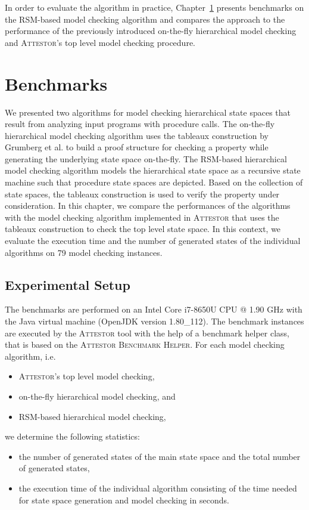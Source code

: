 \documentclass[a4paper, 12pt, twoside]{report}
\begin{document}
	In order to evaluate the algorithm in practice, Chapter~\ref{chp:benchmarks} presents benchmarks on the RSM-based model checking algorithm and compares the approach to the performance of the previously introduced on-the-fly hierarchical model checking and \textsc{Attestor}'s top level model checking procedure.
	
	\chapter{Benchmarks}\label{chp:benchmarks}	
	
	We presented two algorithms for model checking hierarchical state spaces that result from analyzing input programs with procedure calls. The on-the-fly hierarchical model checking algorithm uses the tableaux construction by Grumberg et al. \cite{bhat1995efficient} to build a proof structure for checking a property while generating the underlying state space on-the-fly. The RSM-based hierarchical model checking algorithm models the hierarchical state space as a recursive state machine such that procedure state spaces are depicted. Based on the collection of state spaces, the tableaux construction is used to verify the property under consideration. In this chapter, we compare the performances of the algorithms with the model checking algorithm implemented in \textsc{Attestor} that uses the tableaux construction to check the top level state space. In this context, we evaluate the execution time and the number of generated states of the individual algorithms on 79 model checking instances. 
	
	\section{Experimental Setup}
	
	The benchmarks are performed on an Intel Core i7-8650U CPU @ 1.90 GHz with the Java virtual machine (OpenJDK version 1.80\_112). The benchmark instances are executed by the \textsc{Attestor} tool with the help of a benchmark helper class, that is based on the \textsc{Attestor Benchmark Helper}. For each model checking algorithm, i.e.
	\begin{itemize}
		\item \textsc{Attestor}'s top level model checking,
		\item on-the-fly hierarchical model checking, and
		\item RSM-based hierarchical model checking,
	\end{itemize}
	we determine the following statistics:
	\begin{itemize}
		\item the number of generated states of the main state space and the total number of generated states,
		\item the execution time of the individual algorithm consisting of the time needed for state space generation and model checking in seconds. 
	\end{itemize}  
\end{document}
